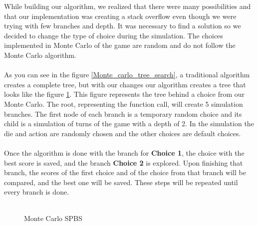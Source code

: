         While building our algorithm, we realized that there were many possibilities and that our implementation was creating a stack overflow even though we were trying with few branches and depth. It was necessary to find a solution so we decided to change the type of choice during the simulation. The choices implemented in Monte Carlo of the game are random and do not follow the Monte Carlo algorithm.\\ \\
        As you can see in the figure \ref{Monte_carlo_tree_search}, a traditional algorithm creates a complete tree, but with our changes our algorithm creates a tree that looks like the figure \ref{Monte_carlo_SPBS}. This figure represents the tree behind a choice from our Monte Carlo. The root, representing the function call, will create 5 simulation branches. The first node of each branch is a temporary random choice and its child is a simulation of turns of the game with a depth of 2. In the simulation the die and action are randomly chosen and the other choices are default choices.\\ \\
        Once the algorithm is done with the branch for \textbf{Choice 1}, the choice with the best score is saved, and the branch \textbf{Choice 2} is explored. Upon finishing that branch, the scores of the first choice and of the choice from that branch will be compared, and the best one will be saved. These steps will be repeated until every branch is done.
        \\ \\
        
        
        \begin{figure}[H]
            \centering
            \caption{Monte Carlo SPBS}
            \label{Monte_carlo_SPBS}
        \end{figure}


